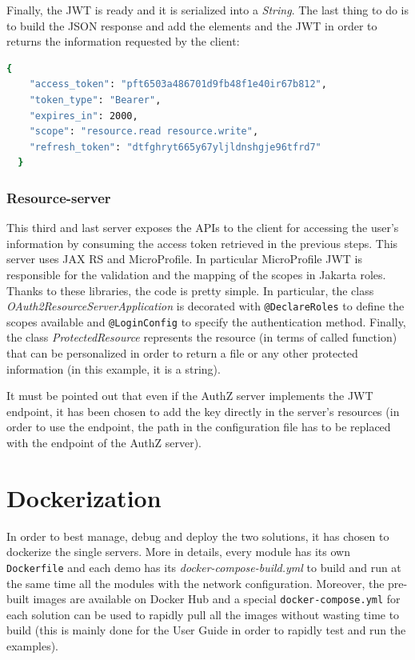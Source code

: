 \noindent Finally, the JWT is ready and it is serialized into a \textit{String}. The last thing to do is to build the JSON response and add the elements and the JWT in order to returns the information requested by the client:

\begin{lstlisting}[language=bash, basicstyle=\fontsize{12}{14}\ttfamily]
  {
    "access_token": "pft6503a486701d9fb48f1e40ir67b812",
    "token_type": "Bearer",  
    "expires_in": 2000,
    "scope": "resource.read resource.write",
    "refresh_token": "dtfghryt665y67yljldnshgje96tfrd7"
  }
\end{lstlisting}

\subsubsection{Resource-server}
This third and last server exposes the APIs to the client for accessing the user's information by consuming the access token retrieved in the previous steps. This server uses JAX RS and MicroProfile. In particular MicroProfile JWT is responsible for the validation and the mapping of the scopes in Jakarta roles. Thanks to these libraries, the code is pretty simple. In particular, the class \textit{OAuth2ResourceServerApplication} is decorated with \texttt{@DeclareRoles} to define the scopes available and \texttt{@LoginConfig} to specify the authentication method. Finally, the class \textit{ProtectedResource} represents the resource (in terms of called function) that can be personalized in order to return a file or any other protected information (in this example, it is a string).

It must be pointed out that even if the AuthZ server implements the JWT endpoint, it has been chosen to add the key directly in the server's resources (in order to use the endpoint, the path in the configuration file has to be replaced with the endpoint of the AuthZ server).

\section{Dockerization}
In order to best manage, debug and deploy the two solutions, it has chosen to dockerize the single servers. More in details, every module has its own \texttt{Dockerfile} and each demo has its \textit{docker-compose-build.yml} to build and run at the same time all the modules with the network configuration. Moreover, the pre-built images are available on Docker Hub and a special \texttt{docker-compose.yml} for each solution can be used to rapidly pull all the images without wasting time to build (this is mainly done for the User Guide in order to rapidly test and run the examples).

